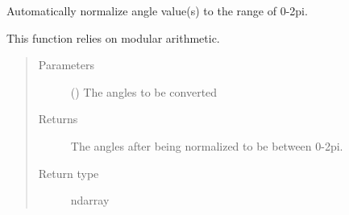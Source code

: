 \documentclass[letterpaper,10pt,english]{sphinxmanual}
\begin{document}
\begin{fulllineitems}
\label{\detokenize{Backend.astronomical_coordinates:Backend.astronomical_coordinates.angle_normalization_0_2pi}}
Automatically normalize angle value(s) to the range of 0-2pi.

This function relies on modular arithmetic.
\begin{quote}\begin{description}
\item[{Parameters}] \leavevmode
{} () \textendash{} The angles to be converted

\item[{Returns}] \leavevmode
{} \textendash{} The angles after being normalized to be between 0-2pi.

\item[{Return type}] \leavevmode
ndarray

\end{description}\end{quote}

\end{fulllineitems}

\end{document}
